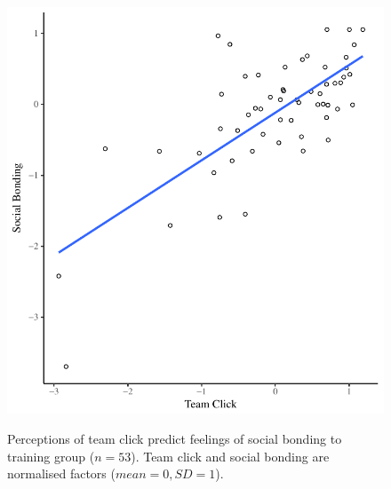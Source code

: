 \begin{figure}
  \centering
    \includegraphics[width=0.5\linewidth,keepaspectratio] {images/groupClickBondScatter}
    \label{fig:groupClickBondScatter}
    \caption{Perceptions of team click predict feelings of social bonding to training group ($n = 53$).  Team click and social bonding are normalised factors ($mean = 0, SD = 1$).}
\end{figure}









